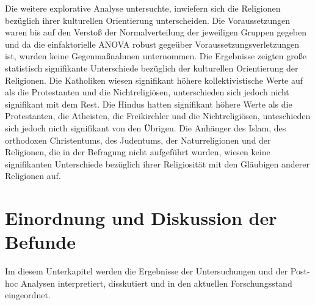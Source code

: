 Die weitere explorative Analyse untersuchte, inwiefern sich die Religionen bezüglich ihrer kulturellen Orientierung unterscheiden. Die Voraussetzungen waren bis auf den Verstoß der Normalverteilung der jeweiligen Gruppen gegeben und da die einfaktorielle ANOVA robust gegeüber Voraussetzungsverletzungen ist, wurden keine Gegenmaßnahmen unternommen. Die Ergebnisse zeigten große statistisch signifikante Unterschiede bezüglich der kulturellen Orientierung der Religionen. Die Katholiken wiesen signifikant höhere kollektivistische Werte auf als die Protestanten und die Nichtreligiösen, unterschieden sich jedoch nicht signifikant mit dem Rest. Die Hindus hatten signifikant höhere Werte als die Protestanten, die Atheisten, die Freikirchler und die Nichtreligiösen, unteschieden sich jedoch nicth signifikant von den Übrigen. Die Anhänger des Islam, des orthodoxen Christentums, des Judentums, der Naturreligionen und der Religionen, die in der Befragung nicht aufgeführt wurden, wiesen keine signifikanten Unterschiede bezüglich ihrer Religiosität mit den Gläubigen anderer Religionen auf.


\section{Einordnung und Diskussion der Befunde}     \label{sec_5.2}
Im diesem Unterkapitel werden die Ergebnisse der Untersuchungen und der Post-hoc Analysen interpretiert, disskutiert und in den aktuellen Forschungsstand eingeordnet.

